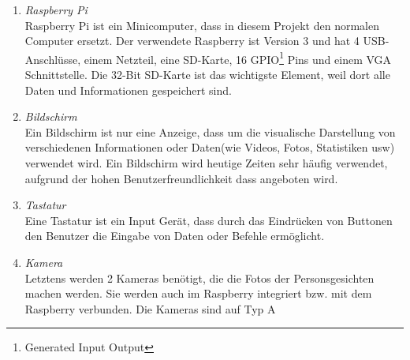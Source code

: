 \begin{enumerate}
	\item \textit{Raspberry Pi} \\
Raspberry Pi ist ein Minicomputer, dass in diesem Projekt den normalen Computer ersetzt. Der verwendete Raspberry ist Version 3 und hat 4 USB-Anschlüsse, einem Netzteil, eine SD-Karte, 16 GPIO\footnote{Generated Input Output} Pins und einem VGA Schnittstelle. Die 32-Bit SD-Karte ist das wichtigste Element, weil dort alle Daten und Informationen gespeichert sind. 
	\item \textit{Bildschirm} \\
Ein Bildschirm ist nur eine Anzeige, dass um die visualische Darstellung von verschiedenen Informationen oder Daten(wie Videos, Fotos, Statistiken usw) verwendet wird. Ein Bildschirm wird heutige Zeiten sehr häufig verwendet, aufgrund der hohen Benutzerfreundlichkeit dass angeboten wird.
	\item \textit{Tastatur} \\
Eine Tastatur ist ein Input Gerät, dass durch das Eindrücken von Buttonen den Benutzer die Eingabe von Daten oder Befehle ermöglicht.
	\item \textit{Kamera} \\
Letztens werden 2 Kameras benötigt, die die Fotos der Personsgesichten machen werden. Sie werden auch im Raspberry integriert bzw. mit dem Raspberry verbunden. Die Kameras sind auf Typ A
\end{enumerate}
